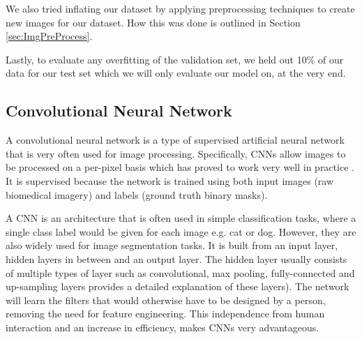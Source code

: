 \documentclass{article}
\begin{document}
We also tried inflating our dataset by applying preprocessing techniques to create new images for our dataset. How this was done is outlined in Section \ref{sec:ImgPreProcess}.

Lastly, to evaluate any overfitting of the validation set, we held out 10\% of our data for our test set which we will only evaluate our model on, at the very end.  

\subsection{Convolutional Neural Network}
\label{sec:CNN}
A convolutional neural network is a type of supervised artificial neural network that is very often used for image processing. Specifically, CNNs allow images to be processed on a per-pixel basis which has proved to work very well in practice \cite{Alom2018TheHB}. It is supervised because the network is trained using both input images (raw biomedical imagery) and labels (ground truth binary masks).

A CNN is an architecture that is often used in simple classification tasks, where a single class label would be given for each image e.g. cat or dog. However, they are also widely used for image segmentation tasks. It is built from an input layer, hidden layers in between and an output layer. The hidden layer usually consists of multiple types of layer such as convolutional, max pooling, fully-connected and up-sampling layers \cite{CNNExplained} provides a detailed explanation of these layers). The network will learn the filters that would otherwise have to be designed by a person, removing the need for feature engineering. This independence from human interaction and an increase in efficiency, makes CNNs very advantageous.


\end{document}
